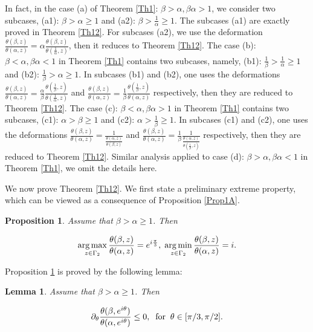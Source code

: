 \documentclass[reqno,english]{amsart}
\newtheorem{lemma}{Lemma}[section]
\newtheorem{proposition}{Proposition}[section]
\newtheorem{open problem}{Open Problem}[section]
\newtheorem{open question}{Open Question}[section]
\newtheorem{open questions on hexagonal lattice}{Open Questions on hexagonal lattice}[section]
\DeclareMathOperator*{\argmax}{arg\,max}
\DeclareMathOperator*{\argmin}{arg\,min}
\begin{document}
In fact,  in the case (a) of Theorem \ref{Th1}: $\beta>\alpha, \beta\alpha>1$, we consider  two subcases, (a1): $\beta>\alpha\geq1$ and (a2): $\beta>\frac{1}{\alpha}\geq1$.
The subcases (a1) are exactly proved in Theorem \ref{Th12}. For subcases (a2), we use the deformation
$\frac{\theta(\beta,z)}{\theta(\alpha,z)}=\alpha\frac{\theta(\beta,z)}{\theta(\frac{1}{\alpha},z)}$, then it reduces to Theorem \ref{Th12}.
The case (b): $\beta<\alpha, \beta\alpha<1$ in Theorem \ref{Th1} contains two subcases, namely, (b1): $\frac{1}{\beta}>\frac{1}{\alpha}\geq1$ and (b2): $\frac{1}{\beta}>\alpha\geq1$. In subcases (b1) and (b2), one uses the deformations $\frac{\theta(\beta,z)}{\theta(\alpha,z)}=\frac{\alpha}{\beta}\frac{\theta(\frac{1}{\beta},z)}{\theta(\frac{1}{\alpha},z)}$ and
$\frac{\theta(\beta,z)}{\theta(\alpha,z)}=\frac{1}{\beta}\frac{\theta(\frac{1}{\beta},z)}{\theta(\alpha,z)}$ respectively, then they are reduced to Theorem \ref{Th12}. The case (c): $\beta<\alpha, \beta\alpha>1$ in Theorem \ref{Th1} contains two subcases, (c1): $\alpha>\beta\geq1$
and (c2): $\alpha>\frac{1}{\beta}\geq1$. In subcases (c1) and (c2), one uses the deformations $\frac{\theta(\beta,z)}{\theta(\alpha,z)}=\frac{1}{\frac{\theta(\alpha,z)}{\theta(\beta,z)}}$ and
$\frac{\theta(\beta,z)}{\theta(\alpha,z)}=\frac{1}{\beta}\frac{1}{\frac{\theta(\alpha,z)}{\theta(\frac{1}{\beta},z)}}$ respectively, then  they are reduced to Theorem \ref{Th12}. Similar analysis applied to case (d): $\beta>\alpha, \beta\alpha<1$ in Theorem \ref{Th1}, we omit the details here.



We now prove Theorem \ref{Th12}. We first state a preliminary extreme property, which can be viewed as a consequence of Proposition \ref{Prop1A}.

\begin{proposition}\label{PropA}
Assume that $\beta>\alpha\geq1$. Then

 \begin{equation}\aligned\nonumber
\argmax_{z\in\Gamma_2}\frac{\theta(\beta,z)}{\theta(\alpha,z)}=e^{i\frac{\pi}{3}},\;
\argmin_{z\in\Gamma_2}\frac{\theta(\beta,z)}{\theta(\alpha,z)}=i.
\endaligned\end{equation}
\end{proposition}

Proposition \ref{PropA} is proved by the following lemma:
\begin{lemma}\label{LemmaA}
Assume that $\beta>\alpha\geq1$. Then

 \begin{equation}\aligned\nonumber
\partial_\theta\frac{\theta(\beta,e^{i\theta})}{\theta(\alpha,e^{i\theta})}\leq0,\;\;\hbox{for}\;\;\theta\in[\pi/3,\pi/2].
\endaligned\end{equation}
\end{lemma}
\end{document}
